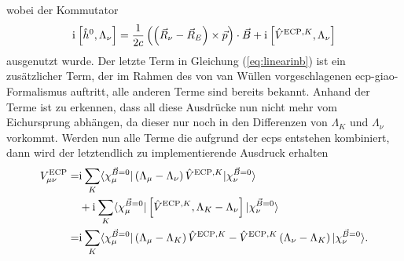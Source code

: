 	wobei der Kommutator	
	\begin{equation}
	\mathrm{i}\mkern1mu\left[\hat{h}^0 ,\Lambda_\nu\right]=\frac{1}{2c}\left(\left(\vec{R}_\nu-\vec{R}_E\right)\times\vec{p}\right)\cdot\vec{B}+\mathrm{i}\mkern1mu\left[\hat{V}^{\textrm{ECP},K} ,\Lambda_\nu\right]
	\end{equation}
	ausgenutzt wurde. Der letzte Term in Gleichung (\ref{eq:linearinb}) ist ein zusätzlicher Term, der im Rahmen des von van Wüllen vorgeschlagenen \ac{ecp}-\ac{giao}-Formalismus auftritt, alle anderen Terme sind bereits bekannt. Anhand der Terme ist zu erkennen, dass all diese Ausdrücke nun nicht mehr vom Eichursprung abhängen, da dieser nur noch in den Differenzen von $\Lambda_K$ und $\Lambda_\nu$ vorkommt. Werden nun alle Terme die aufgrund der \acp{ecp} entstehen kombiniert, dann wird der letztendlich zu implementierende Ausdruck erhalten	
	\begin{equation}\label{eq:vecpmunu}
	\begin{aligned}
	V_{\mu\nu}^{\textrm{ECP}}=&\mathrm{i}\mkern1mu\sum_K\langle\chi_\mu^{\vec{B}=0}\vert\left(\Lambda_\mu -\Lambda_\nu\right)\hat{V}^{\textrm{ECP},K}\vert\chi_\nu^{\vec{B}=0}\rangle\\
	&+\mathrm{i}\mkern1mu\sum_K\langle \chi_\mu^{\vec{B}=0}\vert\left[\hat{V}^{\textrm{ECP},K},\Lambda_K-\Lambda_\nu\right]\vert\chi_\nu^{\vec{B}=0}\rangle\\
	=&\mathrm{i}\mkern1mu\sum_K\langle\chi_\mu^{\vec{B}=0}\vert\left(\Lambda_\mu -\Lambda_K\right)\hat{V}^{\textrm{ECP},K}-\hat{V}^{\textrm{ECP},K}\left(\Lambda_\nu -\Lambda_K\right)\vert\chi_\nu^{\vec{B}=0}\rangle .
	\end{aligned}
	\end{equation}
	\vfill
	\newpage
	
